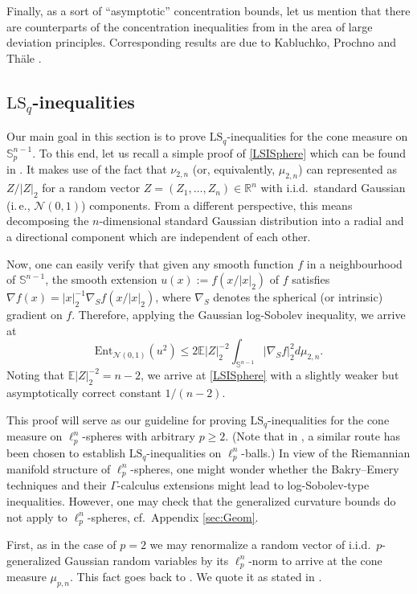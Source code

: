 \documentclass[a4paper,12pt]{amsart}
\numberwithin{equation}{section}
\theoremstyle{remark}
\def\E{{\mathbb E}}
\def\R{{\mathbb R}}
\def\S{{\mathbb S}}
\begin{document}
Finally, as a sort of ``asymptotic'' concentration bounds, let us mention that there are counterparts of the concentration inequalities from \cite{SZ90} in the area of large deviation principles. Corresponding results are due to Kabluchko, Prochno and Th\"{a}le \cite{KPT19}.

\subsection{\texorpdfstring{$\mathrm{LS}_q$}{LS\_q}-inequalities}\label{sec:LSILqSubS}
Our main goal in this section is to prove $\mathrm{LS}_q$-inequalities for the cone measure on $\S_p^{n-1}$. To this end, let us recall a simple proof of \eqref{LSISphere} which can be found in \cite[Ch.\ 9.4]{BCG23}. It makes use of the fact that $\nu_{2,n}$ (or, equivalently, $\mu_{2,n}$) can represented as $Z/\lvert Z \rvert_2$ for a random vector $Z = (Z_1,\ldots,Z_n) \in \R^n$ with i.i.d.\ standard Gaussian (i.\,e., $\mathcal{N}(0,1)$) components. From a different perspective, this means decomposing the $n$-dimensional standard Gaussian distribution into a radial and a directional component which are independent of each other.

Now, one can easily verify that given any smooth function $f$ in a neighbourhood of $\S^{n-1}$, the smooth extension $u(x) := f(x/\lvert x \rvert_2)$ of $f$ satisfies $\nabla f(x) = \lvert x \rvert_2^{-1} \nabla_S f(x/\lvert x \rvert_2)$, where $\nabla_S$ denotes the spherical (or intrinsic) gradient on $f$. Therefore, applying the Gaussian log-Sobolev inequality, we arrive at
\[
\mathrm{Ent}_{\mathcal{N}(0,1)} (u^2) \le 2 \E\lvert Z \rvert_2^{-2} \int_{\S^{n-1}} |\nabla_S f|_2^2 d\mu_{2,n}.
\]
Noting that $\E\lvert Z \rvert_2^{-2} = n-2$, we arrive at \eqref{LSISphere} with a slightly weaker but asymptotically correct constant $1/(n-2)$.

This proof will serve as our guideline for proving $\mathrm{LS}_q$-inequalities for the cone measure on $\ell_p^n$-spheres with arbitrary $p \ge 2$. (Note that in \cite[Ch.\ 5]{BL00}, a similar route has been chosen to establish $\mathrm{LS}_q$-inequalities on $\ell_p^n$-balls.) In view of the Riemannian manifold structure of $\ell_p^n$-spheres, one might wonder whether the Bakry--Emery techniques and their $\Gamma$-calculus extensions might lead to log-Sobolev-type inequalities. However, one may check that the generalized curvature bounds do not apply to $\ell_p^n$-spheres, cf.\ Appendix \ref{sec:Geom}.

First, as in the case of $p=2$ we may renormalize a random vector of i.i.d.\ $p$-generalized Gaussian random variables by its $\ell_p^n$-norm to arrive at the cone measure $\mu_{p,n}$. This fact goes back to \cite{SZ90,RR91}. We quote it as stated in \cite[Th.\ 9.3.2]{PTT19}.
\end{document}
